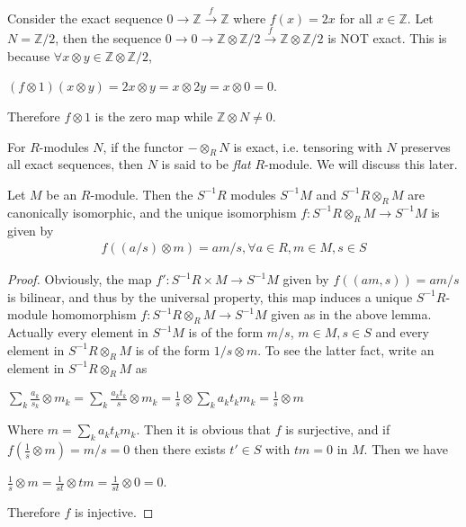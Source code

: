 \begin{example}
\label{example-tensor-product-not-exact}
Consider the exact sequence
$0\rightarrow \mathbb{Z}\xrightarrow{f} \mathbb{Z}$ where 
$f(x)=2x$ for all $x\in
\mathbb{Z}$. Let $N=\mathbb{Z}/2$, then the sequence
$0\rightarrow 0\rightarrow 
\mathbb{Z}\otimes \mathbb{Z}/2 \xrightarrow{f}
\mathbb{Z}\otimes \mathbb{Z}/2$
is NOT exact. This is because
$\forall x\otimes y\in \mathbb{Z}\otimes \mathbb{Z}/2$,
\begin{center}
$(f\otimes 1)(x\otimes y)=2x\otimes y=x\otimes 2y=x\otimes 0=0$.
\end{center}
Therefore $f\otimes 1$ is the zero map while $\mathbb{Z}\otimes N\neq 0$.
\end{example}

\begin{remark}
\label{remark-flat-module}
For $R$-modules $N$, if the
functor $-\otimes_{R} N$ is exact, i.e. tensoring 
with $N$ preserves all exact
sequences, then $N$ is said to be \textit{flat} $R$-module.
We will discuss this later.
\end{remark}

\begin{lemma}
\label{lemma-tensor-localization}
Let $M$ be an $R$-module. Then the $S^{-1}R$ modules $S^{-1}M$
and $S^{-1}R\otimes_{R}M$ are canonically isomorphic, and the
unique isomorphism $f:S^{-1}R\otimes_{R}M\rightarrow S^{-1}M$
is given by
\begin{align}
f((a/s)\otimes m)=am/s, \forall a\in R, m\in M, s\in S
\end{align}
\end{lemma}

\begin{proof}
Obviously, the map
$f':S^{-1}R\times M\rightarrow S^{-1}M$ given by $f((am,s))=am/s$ is 
bilinear, and thus by the
universal property, this map induces a unique $S^{-1}R$-module homomorphism
$f:S^{-1}R\otimes_{R}M\rightarrow S^{-1}M$ given as in the above lemma.
Actually every element in $S^{-1}M$ is of the form $m/s$, $m\in M, s\in S$ and 
every element in
$S^{-1}R\otimes_{R}M$ is of the form $1/s \otimes m$. To see the latter fact, 
write an element in
$S^{-1}R\otimes_{R}M$ as
\begin{center}
$\sum_{k}\frac{a_k}{s_k}\otimes m_k=\sum_{k}\frac{a_{k}t_k}{s}\otimes
m_k=\frac{1}{s}\otimes\sum_{k}{a_{k}t_k}m_k=\frac{1}{s}\otimes m$
\end{center}
Where $m=\sum_{k}{a_{k}t_k}m_k$. Then it is obvious that $f$ is surjective, and 
if $f(\frac{1}{s}\otimes
m)=m/s=0$ then there exists $t'\in S$ with $tm=0$ in $M$. Then we have
\begin{center}
$\frac{1}{s} \otimes m = \frac{1}{st} \otimes tm = \frac{1}{st} \otimes 0 = 0$.
\end{center}
Therefore $f$ is injective.
\end{proof}

